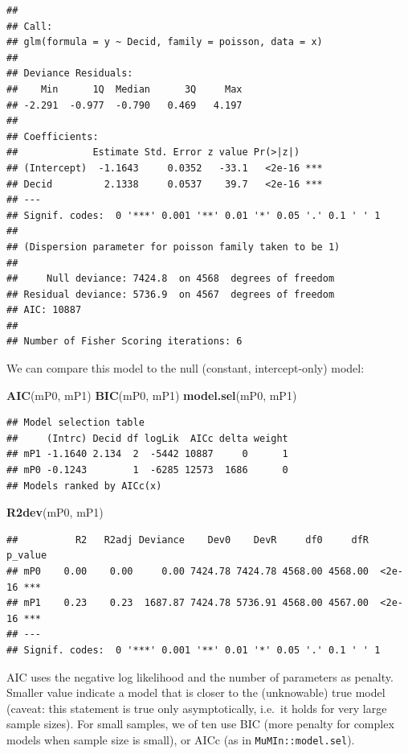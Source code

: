 \documentclass[12pt,]{book}
\newenvironment{Shaded}{\begin{snugshade}}{\end{snugshade}}
\newcommand{\KeywordTok}[1]{\textcolor[rgb]{0.13,0.29,0.53}{\textbf{#1}}}
\newcommand{\NormalTok}[1]{#1}
\begin{document}
\begin{verbatim}
## 
## Call:
## glm(formula = y ~ Decid, family = poisson, data = x)
## 
## Deviance Residuals: 
##    Min      1Q  Median      3Q     Max  
## -2.291  -0.977  -0.790   0.469   4.197  
## 
## Coefficients:
##             Estimate Std. Error z value Pr(>|z|)    
## (Intercept)  -1.1643     0.0352   -33.1   <2e-16 ***
## Decid         2.1338     0.0537    39.7   <2e-16 ***
## ---
## Signif. codes:  0 '***' 0.001 '**' 0.01 '*' 0.05 '.' 0.1 ' ' 1
## 
## (Dispersion parameter for poisson family taken to be 1)
## 
##     Null deviance: 7424.8  on 4568  degrees of freedom
## Residual deviance: 5736.9  on 4567  degrees of freedom
## AIC: 10887
## 
## Number of Fisher Scoring iterations: 6
\end{verbatim}

We can compare this model to the null (constant, intercept-only) model:

\begin{Shaded}
\begin{Highlighting}[]
\KeywordTok{AIC}\NormalTok{(mP0, mP1)}
\KeywordTok{BIC}\NormalTok{(mP0, mP1)}
\KeywordTok{model.sel}\NormalTok{(mP0, mP1)}
\end{Highlighting}
\end{Shaded}

\begin{verbatim}
## Model selection table 
##     (Intrc) Decid df logLik  AICc delta weight
## mP1 -1.1640 2.134  2  -5442 10887     0      1
## mP0 -0.1243        1  -6285 12573  1686      0
## Models ranked by AICc(x)
\end{verbatim}

\begin{Shaded}
\begin{Highlighting}[]
\KeywordTok{R2dev}\NormalTok{(mP0, mP1)}
\end{Highlighting}
\end{Shaded}

\begin{verbatim}
##          R2   R2adj Deviance    Dev0    DevR     df0     dfR p_value    
## mP0    0.00    0.00     0.00 7424.78 7424.78 4568.00 4568.00  <2e-16 ***
## mP1    0.23    0.23  1687.87 7424.78 5736.91 4568.00 4567.00  <2e-16 ***
## ---
## Signif. codes:  0 '***' 0.001 '**' 0.01 '*' 0.05 '.' 0.1 ' ' 1
\end{verbatim}

AIC uses the negative log likelihood and the number of parameters as penalty.
Smaller value indicate a model that is closer to the (unknowable) true model
(caveat: this statement is true only asymptotically, i.e.~it holds for very large
sample sizes). For small samples, we of ten use BIC (more penalty for complex models
when sample size is small), or AICc (as in \texttt{MuMIn::model.sel}).
\end{document}
